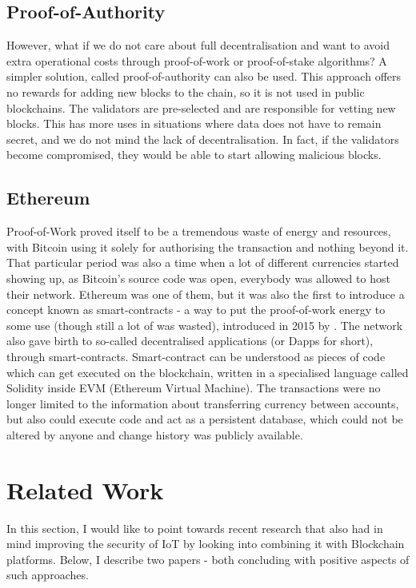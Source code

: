 \subsection{Proof-of-Authority}\label{sec:poa}
However, what if we do not care about full decentralisation and want to avoid extra operational costs through proof-of-work or proof-of-stake algorithms? A simpler solution, called proof-of-authority \cite{network2017proof} can also be used. This approach offers no rewards for adding new blocks to the chain, so it is not used in public blockchains. The validators are pre-selected and are responsible for vetting new blocks. This has more uses in situations where data does not have to remain secret, and we do not mind the lack of decentralisation. In fact, if the validators become compromised, they would be able to start allowing malicious blocks.
\subsection{Ethereum}
Proof-of-Work proved itself to be a tremendous waste of energy and resources, with Bitcoin using it solely for authorising the transaction and nothing beyond it. That particular period was also a time when a lot of different currencies started showing up, as Bitcoin's source code was open, everybody was allowed to host their network. Ethereum was one of them, but it was also the first to introduce a concept known as smart-contracts - a way to put the proof-of-work energy to some use (though still a lot of was wasted), introduced in 2015 by \citet{buterin2014ethereum}. The network also gave birth to so-called decentralised applications (or Dapps for short), through smart-contracts. Smart-contract can be understood as pieces of code which can get executed on the blockchain, written in a specialised language called Solidity inside EVM (Ethereum Virtual Machine). The transactions were no longer limited to the information about transferring currency between accounts, but also could execute code and act as a persistent database, which could not be altered by anyone and change history was publicly available.


\section{Related Work}
In this section, I would like to point towards recent research that also had in mind improving the security of IoT by looking into combining it with Blockchain platforms. Below, I describe two papers - both concluding with positive aspects of such approaches.

